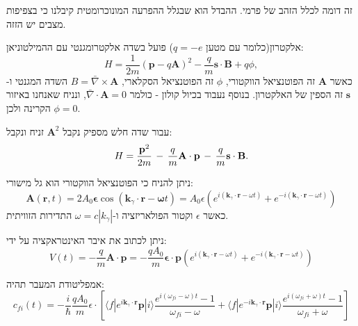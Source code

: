 \documentclass{tstextbook}
\begin{document}
\begin{remark}
זה דומה לכלל הזהב של פרמי. ההבדל הוא שבגלל ההפרעה המונוכרומטית קיבלנו כי בצפיפות מצבים יש הזזה.

\end{remark}
\begin{definition}
אלקטרון(כלומר עם מטען \(q=-e\)) פועל בשדה אלקטרומגנטי עם ההמילטוניאן:
$$H={\frac{1}{2m}}\left(\mathbf{p}-q\mathbf{A}\right)^{2}-{\frac{q}{m}}\mathbf{s}\cdot\mathbf{B}+q\phi,$$
כאשר \(\mathbf{A}\) זה הפוטנציאל הווקטורי, \(\phi\) זה הפוטנציאל הסקלארי, \(B=\bar{\nabla} \times \mathbf{A}\) השדה המגנטי ו-\(\mathbf{s}\) זה הספין של האלקטרון. בנוסף נעבוד בכיול קולון - כולמר \(\bar{\nabla} \cdot \mathbf{A}=0\), ונניח שאנחנו באיזור הקרינה ולכן \(\phi=0\).

\end{definition}
\begin{proposition}
עבור שדה חלש מספיק נקבל \(\mathbf{A}^{2}\) זניח ונקבל:
$$H={\frac{{\bf p}^{2}}{2m}}\,-\,{\frac{q}{m}}{\bf A}\cdot{\bf p}\,-\,{\frac{q}{m}}{\bf s}\cdot{\bf B}.$$

\end{proposition}
\begin{proposition}
ניתן להניח כי הפוטנציאל הווקטורי הוא גל מישורי:
$$\mathbf{A}(\mathbf{r},t)=2A_{0}{\boldsymbol{\epsilon}}\cos(\mathbf{k}_{\gamma}\cdot\mathbf{r}-{\boldsymbol{\omega}}t)=A_{0}\epsilon\left(e^{i(\mathbf{k}_{\gamma}\cdot\mathbf{r}-\omega t)}+e^{-i(\mathbf{k}_{\gamma}\cdot\mathbf{r}-\omega t)}\right)$$
כאשר \(\epsilon\) וקטור הפולאריזציה ו-\(\omega=c|k_{\gamma}|\) התדירות הזוויתית.

\end{proposition}
\begin{corollary}
ניתן לכתוב את איבר האינטראקציה על ידי:
$$V(t)=-{\frac{q}{m}}\mathbf{A}\cdot\mathbf{p}=-{\frac{q A_{0}}{m}}\mathbf{\epsilon}\cdot\mathbf{p}\left(e^{i(\mathbf{k}_{\gamma}\cdot\mathbf{r}-\omega t)}+e^{-i(\mathbf{k}_{\gamma}\cdot\mathbf{r}-\omega t)}\right)$$

\end{corollary}
\begin{corollary}
אמפליטודת המעבר תהיה:
$$c_{fi}(t)=-\frac{i}{\hbar}\frac{qA_{0}}{m}\epsilon\cdot\left[\langle f|e^{i\mathbf{k}_{\gamma}\cdot\mathbf{r}}\mathbf{p}|i\rangle\frac{e^{i(\omega_{fi}-\omega)t}-1}{\omega_{fi}-\omega}+\langle f|e^{-i\mathbf{k}_{\gamma}\cdot\mathbf{r}}\mathbf{p}|i\rangle\frac{e^{i(\omega_{fi}+\omega)t}-1}{\omega_{fi}+\omega}\right]$$

\end{corollary}
\end{document}
